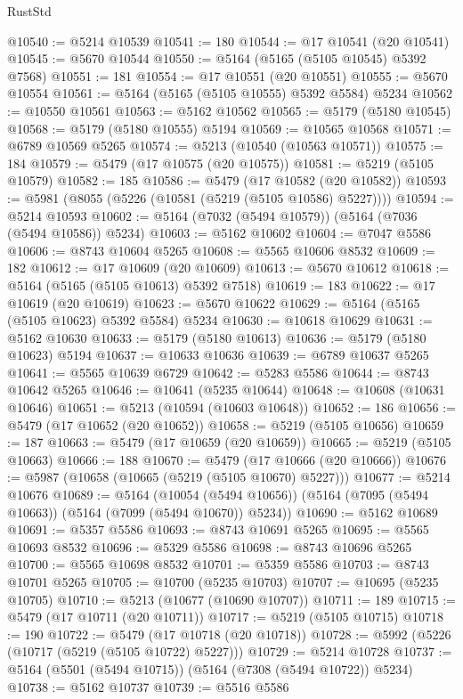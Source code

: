 \begin{lexlean}{RustStd}
\begin{coremodule}
@10540 := @5214 @10539
@10541 := 180
@10544 := @17 @10541 (@20 @10541)
@10545 := @5670 @10544
@10550 := @5164 (@5165 (@5105 @10545) @5392 @7568)
@10551 := 181
@10554 := @17 @10551 (@20 @10551)
@10555 := @5670 @10554
@10561 := @5164 (@5165 (@5105 @10555) @5392 @5584) @5234
@10562 := @10550 @10561
@10563 := @5162 @10562
@10565 := @5179 (@5180 @10545)
@10568 := @5179 (@5180 @10555) @5194
@10569 := @10565 @10568
@10571 := @6789 @10569 @5265
@10574 := @5213 (@10540 (@10563 @10571))
@10575 := 184
@10579 := @5479 (@17 @10575 (@20 @10575))
@10581 := @5219 (@5105 @10579)
@10582 := 185
@10586 := @5479 (@17 @10582 (@20 @10582))
@10593 := @5981 (@8055 (@5226 (@10581 (@5219 (@5105 @10586) @5227))))
@10594 := @5214 @10593
@10602 := @5164 (@7032 (@5494 @10579)) (@5164 (@7036 (@5494 @10586)) @5234)
@10603 := @5162 @10602
@10604 := @7047 @5586
@10606 := @8743 @10604 @5265
@10608 := @5565 @10606 @8532
@10609 := 182
@10612 := @17 @10609 (@20 @10609)
@10613 := @5670 @10612
@10618 := @5164 (@5165 (@5105 @10613) @5392 @7518)
@10619 := 183
@10622 := @17 @10619 (@20 @10619)
@10623 := @5670 @10622
@10629 := @5164 (@5165 (@5105 @10623) @5392 @5584) @5234
@10630 := @10618 @10629
@10631 := @5162 @10630
@10633 := @5179 (@5180 @10613)
@10636 := @5179 (@5180 @10623) @5194
@10637 := @10633 @10636
@10639 := @6789 @10637 @5265
@10641 := @5565 @10639 @6729
@10642 := @5283 @5586
@10644 := @8743 @10642 @5265
@10646 := @10641 (@5235 @10644)
@10648 := @10608 (@10631 @10646)
@10651 := @5213 (@10594 (@10603 @10648))
@10652 := 186
@10656 := @5479 (@17 @10652 (@20 @10652))
@10658 := @5219 (@5105 @10656)
@10659 := 187
@10663 := @5479 (@17 @10659 (@20 @10659))
@10665 := @5219 (@5105 @10663)
@10666 := 188
@10670 := @5479 (@17 @10666 (@20 @10666))
@10676 := @5987 (@10658 (@10665 (@5219 (@5105 @10670) @5227)))
@10677 := @5214 @10676
@10689 := @5164
    (@10054 (@5494 @10656))
    (@5164 (@7095 (@5494 @10663)) (@5164 (@7099 (@5494 @10670)) @5234))
@10690 := @5162 @10689
@10691 := @5357 @5586
@10693 := @8743 @10691 @5265
@10695 := @5565 @10693 @8532
@10696 := @5329 @5586
@10698 := @8743 @10696 @5265
@10700 := @5565 @10698 @8532
@10701 := @5359 @5586
@10703 := @8743 @10701 @5265
@10705 := @10700 (@5235 @10703)
@10707 := @10695 (@5235 @10705)
@10710 := @5213 (@10677 (@10690 @10707))
@10711 := 189
@10715 := @5479 (@17 @10711 (@20 @10711))
@10717 := @5219 (@5105 @10715)
@10718 := 190
@10722 := @5479 (@17 @10718 (@20 @10718))
@10728 := @5992 (@5226 (@10717 (@5219 (@5105 @10722) @5227)))
@10729 := @5214 @10728
@10737 := @5164 (@5501 (@5494 @10715)) (@5164 (@7308 (@5494 @10722)) @5234)
@10738 := @5162 @10737
@10739 := @5516 @5586

\end{coremodule}
\end{lexlean}
